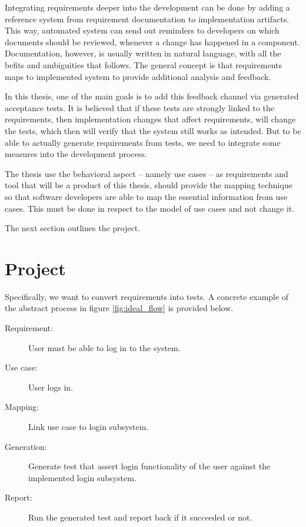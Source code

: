 \noindent Integrating requirements deeper into the development can be done by adding a reference system from requirement documentation to implementation artifacts. This way, automated system can send out reminders to developers on which documents should be reviewed, whenever a change has happened in a component. Documentation, however, is usually written in natural language, with all the befits and ambiguities that follows. The general concept is that requirements maps to implemented system to provide additional analysis and feedback.\medskip

\noindent In this thesis, one of the main goals is to add this feedback channel via generated acceptance tests. It is believed that if these tests are strongly linked to the requirements, then implementation changes that affect requirements, will change the tests, which then will verify that the system still works as intended. But to be able to actually generate requirements from tests, we need to integrate some measures into the development process.\medskip

\noindent The thesis use the behavioral aspect -- namely use cases -- as requirements and tool that will be a product of this thesis, should provide the mapping technique so that software developers are able to map the essential information from use cases. This must be done in respect to the model of use cases and not change it.\medskip

\noindent The next section outlines the project.

\section{Project}
Specifically, we want to convert requirements into tests. A concrete example of the abstract process in figure \ref{fig:ideal_flow} is provided below.\medskip

\begin{description}
  \item[Requirement:] User must be able to log in to the system.
  \item[Use case:] User logs in.
  \item[Mapping:] Link use case to login subsystem.
  \item[Generation:] Generate test that assert login functionality of the user against the implemented login subsystem.
  \item[Report:] Run the generated test and report back if it succeeded or not.
\end{description}

